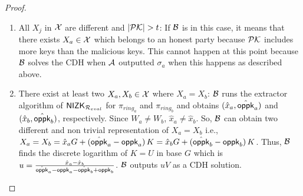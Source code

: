 \begin{proof}
\begin{enumerate}
		\item All $ X_j $ in $ {\mathcal{X}} $ are different and $ |{\mathcal{PK}}| > t $: If $ \mathcal{B} $ is in this case, it means that there exists $ X_a \in {\ensuremath{\mathcal{X}}} $ which belongs to an honest party because $ {\mathcal{PK}} $ includes more keys than the malicious keys. This cannot happen at this point because $ \mathcal{B} $ solves the CDH when $ \mathcal{A} $ outputted $ \sigma_a $ when this happens as described above. 
		\item  There exist at least two $ X_a,X_b \in {\ensuremath{\mathcal{X}}} $ where $ X_a = X_b $: $ \mathcal{B} $ runs the extractor algorithm of $ {\mathsf{NIZK}}_{\mathcal{R}_{eval}} $ for $ \pi_{ring_a} $ and $ \pi_{ring_b} $ and obtains $(\hat{x}_a,\hat{\mathsf{oppk}}_a )$ and $(\hat{x}_b,\hat{\mathsf{oppk}}_b )$, respectively. Since $ W_a \neq W_b $, $ \hat{x}_a \neq \hat{x}_b $. So, $ \mathcal{B} $ can obtain two different and non trivial representation of $ X_a = X_b $ i.e., $ X_a = X_b = \hat{x}_aG + (\hat{\mathsf{oppk}}_a - \mathsf{oppk}_a) \, K = \hat{x}_bG + (\hat{\mathsf{oppk}}_b - \mathsf{oppk}_b) \, K $. Thus, $ \mathcal{B} $ finds the discrete logarithm of $ K = U $ in base $ G $ which is $ u = \frac{\hat{x}_a - \hat{x}_b}{\hat{\mathsf{oppk}}_a -\mathsf{oppk}_a -\hat{\mathsf{oppk}}_b + \mathsf{oppk}_b} $. $ \mathcal{B} $ outputs $ uV $ as a CDH solution.
	\end{enumerate}
	

\end{proof}
